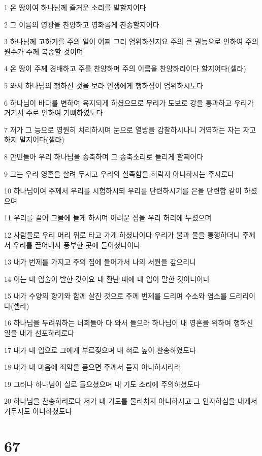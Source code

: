 \par 1 온 땅이여 하나님께 즐거운 소리를 발할지어다
\par 2 그 이름의 영광을 찬양하고 영화롭게 찬송할지어다
\par 3 하나님께 고하기를 주의 일이 어찌 그리 엄위하신지요 주의 큰 권능으로 인하여 주의 원수가 주께 복종할 것이며
\par 4 온 땅이 주께 경배하고 주를 찬양하며 주의 이름을 찬양하리이다 할지어다(셀라)
\par 5 와서 하나님의 행하신 것을 보라 인생에게 행하심이 엄위하시도다
\par 6 하나님이 바다를 변하여 육지되게 하셨으므로 무리가 도보로 강을 통과하고 우리가 거기서 주로 인하여 기뻐하였도다
\par 7 저가 그 능으로 영원히 치리하시며 눈으로 열방을 감찰하시나니 거역하는 자는 자고하지 말지어다(셀라)
\par 8 만민들아 우리 하나님을 송축하며 그 송축소리로 들리게 할찌어다
\par 9 그는 우리 영혼을 살려 두시고 우리의 실족함을 허락지 아니하시는 주시로다
\par 10 하나님이여 주께서 우리를 시험하시되 우리를 단련하시기를 은을 단련함 같이 하셨으며
\par 11 우리를 끌어 그물에 들게 하시며 어려운 짐을 우리 허리에 두셨으며
\par 12 사람들로 우리 머리 위로 타고 가게 하셨나이다 우리가 불과 물을 통행하더니 주께서 우리를 끌어내사 풍부한 곳에 들이셨나이다
\par 13 내가 번제를 가지고 주의 집에 들어가서 나의 서원을 갚으리니
\par 14 이는 내 입술이 발한 것이요 내 환난 때에 내 입이 말한 것이니이다
\par 15 내가 수양의 향기와 함께 살진 것으로 주께 번제를 드리며 수소와 염소를 드리리이다(셀라)
\par 16 하나님을 두려워하는 너희들아 다 와서 들으라 하나님이 내 영혼을 위하여 행하신 일을 내가 선포하리로다
\par 17 내가 내 입으로 그에게 부르짖으며 내 혀로 높이 찬송하였도다
\par 18 내가 내 마음에 죄악을 품으면 주께서 듣지 아니하시리라
\par 19 그러나 하나님이 실로 들으셨으며 내 기도 소리에 주의하셨도다
\par 20 하나님을 찬송하리로다 저가 내 기도를 물리치지 아니하시고 그 인자하심을 내게서 거두지도 아니하셨도다

\chapter{67}

